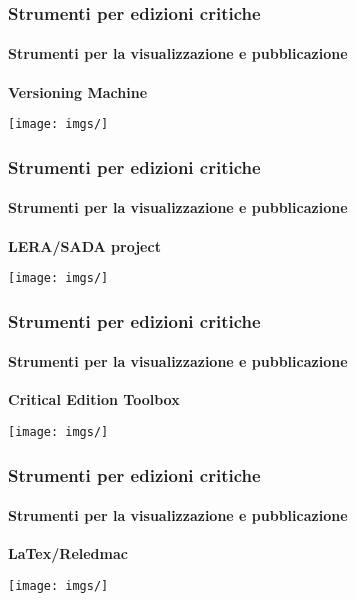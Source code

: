 \begin{frame}
    \frametitle{Strumenti per edizioni critiche}
    \framesubtitle{Strumenti per la visualizzazione e pubblicazione}
	\addtocounter{nframe}{1}
    \begin{center}
        \textbf{Versioning Machine}
    \end{center}
    \begin{center}
        \textit{}
	\end{center}
    \begin{center}
        \texttt{[image: imgs/]}
	\end{center}
\end{frame}

\begin{frame}
    \frametitle{Strumenti per edizioni critiche}
    \framesubtitle{Strumenti per la visualizzazione e pubblicazione}
	\addtocounter{nframe}{1}
    \begin{center}
        \textbf{LERA/SADA project}
    \end{center}
    \begin{center}
        \textit{}
	\end{center}
    \begin{center}
        \texttt{[image: imgs/]}
	\end{center}
\end{frame}

\begin{frame}
    \frametitle{Strumenti per edizioni critiche}
    \framesubtitle{Strumenti per la visualizzazione e pubblicazione}
	\addtocounter{nframe}{1}
    \begin{center}
        \textbf{Critical Edition Toolbox}
    \end{center}
    \begin{center}
        \textit{}
	\end{center}
    \begin{center}
        \texttt{[image: imgs/]}
	\end{center}
\end{frame}

\begin{frame}
    \frametitle{Strumenti per edizioni critiche}
    \framesubtitle{Strumenti per la visualizzazione e pubblicazione}
	\addtocounter{nframe}{1}
    \begin{center}
        \textbf{LaTex/Reledmac}
    \end{center}
    \begin{center}
        \textit{}
	\end{center}
    \begin{center}
        \texttt{[image: imgs/]}
	\end{center}
\end{frame}

